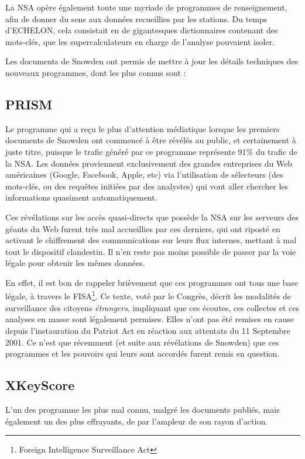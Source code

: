 La NSA opère également toute une myriade de programmes de
renseignement, afin de donner du sens aux données recueillies par les stations.
Du temps d'ECHELON, cela consistait en de gigantesques dictionnaires contenant
des mots-clés, que les supercalculateurs en charge de l'analyse pouvaient
isoler.\newline

Les documents de Snowden ont permis de mettre à jour les détails
techniques des nouveaux programmes, dont les plus connus sont :

\subsection{PRISM}
Le programme qui a reçu le plus d'attention médiatique
lorsque les premiers documents de Snowden ont commencé à être révélés au public,
et certainement à juste titre, puisque le trafic généré par ce programme
représente 91\% du trafic de la NSA\citep{WP91}. Les données proviennent
exclusivement des grandes entreprises du Web américaines (Google, Facebook,
Apple, etc) via l'utilisation de sélecteurs (des mots-clés, ou des requêtes
initiées par des analystes) qui vont aller chercher les informations quasiment
automatiquement.\newline

Ces révélations sur les accès quasi-directs que possède la NSA sur
les serveurs des géants du Web furent très mal accueillies par ces derniers, qui
ont riposté en activant le chiffrement des communications sur leurs flux
internes\citep{WPGoogle}, mettant à mal tout le dispositif clandestin. Il n'en
reste pas moins possible de passer par la voie légale pour obtenir les mêmes
données.\newline

En effet, il est bon de rappeler brièvement que ces programmes ont
tous une base légale, à travers le FISA\footnote{Foreign Intelligence
Surveillance Act}. Ce texte, voté par le Congrès, décrit les modalités de
surveillance des citoyens \emph{étrangers}, impliquant que ces écoutes, ces
collectes et ces analyses en masse sont légalement permises. Elles n'ont pas
été remises en cause depuis l'instauration du Patriot Act en réaction aux attentats du 11 Septembre 2001.
Ce n'est que récemment (et suite aux révélations de Snowden) que ces programmes
et les pouvoirs qui leurs sont accordés furent remis en question.

\subsection{XKeyScore}
L'un des programme les plus mal connu, malgré les
documents publiés, mais également un des plus effrayants, de par l'ampleur de
son rayon d'action. \newline

